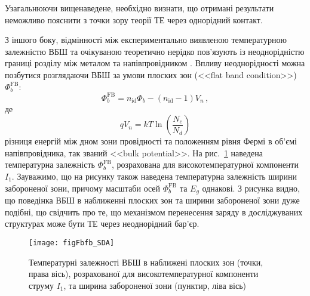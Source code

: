 Узагальнюючи вищенаведене, необхідно визнати, що отримані результати неможливо пояснити з точки зору теорії ТЕ через однорідний контакт.


З іншого боку, відмінності між експериментально виявленою температурною залежністю ВБШ та очікуваною теоретично нерідко
пов'язують із неоднорідністю границі розділу між металом та напівпровідником \cite{Dokme}.
Впливу неоднорідності можна позбутися розглядаючи ВБШ за умови плоских зон (<<flat band condition>>) $\Phi_{b}^\mathrm{FB}$:
\begin{equation}
\label{eqFbfb}
\Phi_{b}^\mathrm{FB}=n_\mathrm{id}\Phi_{b}-(n_\mathrm{id}-1)V_n\,,
\end{equation}
де
\begin{equation}
\label{eqVn}
qV_n=kT\ln\left(\frac{N_c}{N_d}\right)
\end{equation}
різниця енергій між дном зони провідності та положенням рівня Фермі в об'ємі напівпровідника,
так званий <<bulk potential>>.
На рис.~\ref{figFbfb_SDA} наведена температурна залежність $\Phi_{b}^\mathrm{FB}$, розрахована для високотемпературної компоненти $I_1$.
Зауважимо, що на рисунку також наведена температурна залежність ширини забороненої зони, причому
масштаби осей $\Phi_{b}^\mathrm{FB}$ та $E_g$ однакові.
З рисунка видно, що поведінка ВБШ в наближенні плоских зон та ширини забороненої зони дуже подібні,
що свідчить про те, що механізмом перенесення заряду в досліджуваних структурах може бути ТЕ через неоднорідний бар'єр.


\begin{figure}
\center
\texttt{[image: figFbfb\_SDA]}
\caption{\label{figFbfb_SDA}
Температурні залежності ВБШ в наближені плоских зон (точки, права вісь), розрахованої
для високотемпературної компоненти струму $I_1$, та ширина забороненої зони (пунктир, ліва вісь)
}%
\end{figure}

